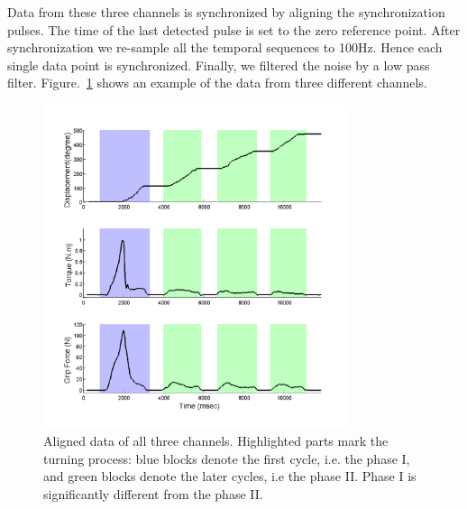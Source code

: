 
Data from these three channels is synchronized by aligning the synchronization pulses. The time of the last detected pulse is set to the zero reference point. After synchronization we re-sample all the temporal sequences to 100Hz. Hence each single data point is synchronized. Finally, we filtered the noise by a low pass filter. Figure.~\ref{fig:3channels} shows an example of the data from three different channels.




\begin{figure}
  \centering
  \hspace{-0.5cm}
  \includegraphics[width=9cm]{./fig/b3c2_1_sTF.pdf}
  \vspace{-0.5cm}
  \caption{ \scriptsize{Aligned data of all three channels. Highlighted parts mark the turning process: blue blocks denote the first cycle, i.e. the phase I, and green blocks denote the later cycles, i.e the phase II. Phase I is significantly different from the phase II.}
}
\label{fig:3channels}
\end{figure}

